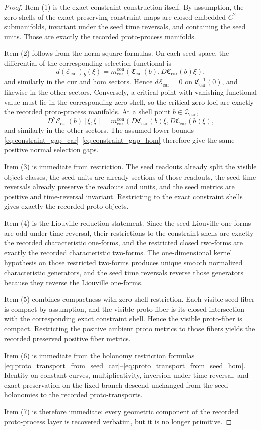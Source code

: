 \documentclass[11pt]{article}
\newcommand{\TensorProtoSpace}{\mathcal Z_{\mathrm{car}}}
\newcommand{\TensorSelection}{\mathscr E_{\mathrm{car}}}
\newcommand{\TensorConstraintMetric}{m_{\mathrm{car}}^{\mathrm{con}}}
\newcommand{\TensorConstraintMap}{\mathfrak C_{\mathrm{car}}}
\begin{document}
\begin{proof}
Item (1) is the exact-constraint construction itself. By assumption, the zero shells of the exact-preserving constraint maps are closed embedded \(C^2\) submanifolds, invariant under the seed time reversals, and containing the seed units. Those are exactly the recorded proto-process manifolds.

Item (2) follows from the norm-square formulas. On each seed space, the differential of the corresponding selection functional is
\[
d(\TensorSelection)_b(\xi)
=
\TensorConstraintMetric\!\left(\TensorConstraintMap(b),D\TensorConstraintMap(b)\xi\right),
\]
and similarly in the \(\mathrm{cur}\) and \(\mathrm{hom}\) sectors. Hence \(d\TensorSelection=0\) on \(\TensorConstraintMap^{-1}(0)\), and likewise in the other sectors. Conversely, a critical point with vanishing functional value must lie in the corresponding zero shell, so the critical zero loci are exactly the recorded proto-process manifolds. At a shell point \(b\in\TensorProtoSpace\),
\[
D^2\TensorSelection(b)[\xi,\xi]
=
\TensorConstraintMetric\!\left(D\TensorConstraintMap(b)\xi,D\TensorConstraintMap(b)\xi\right),
\]
and similarly in the other sectors. The assumed lower bounds \eqref{eq:constraint_gap_car}--\eqref{eq:constraint_gap_hom} therefore give the same positive normal selection gaps.

Item (3) is immediate from restriction. The seed readouts already split the visible object classes, the seed units are already sections of those readouts, the seed time reversals already preserve the readouts and units, and the seed metrics are positive and time-reversal invariant. Restricting to the exact constraint shells gives exactly the recorded proto objects.

Item (4) is the Liouville reduction statement. Since the seed Liouville one-forms are odd under time reversal, their restrictions to the constraint shells are exactly the recorded characteristic one-forms, and the restricted closed two-forms are exactly the recorded characteristic two-forms. The one-dimensional kernel hypothesis on those restricted two-forms produces unique smooth normalized characteristic generators, and the seed time reversals reverse those generators because they reverse the Liouville one-forms.

Item (5) combines compactness with zero-shell restriction. Each visible seed fiber is compact by assumption, and the visible proto-fiber is its closed intersection with the corresponding exact constraint shell. Hence the visible proto-fiber is compact. Restricting the positive ambient proto metrics to those fibers yields the recorded preserved positive fiber metrics.

Item (6) is immediate from the holonomy restriction formulas \eqref{eq:proto_transport_from_seed_car}--\eqref{eq:proto_transport_from_seed_hom}. Identity on constant curves, multiplicativity, inversion under time reversal, and exact preservation on the fixed branch descend unchanged from the seed holonomies to the recorded proto-transports.

Item (7) is therefore immediate: every geometric component of the recorded proto-process layer is recovered verbatim, but it is no longer primitive.
\end{proof}
\end{document}
